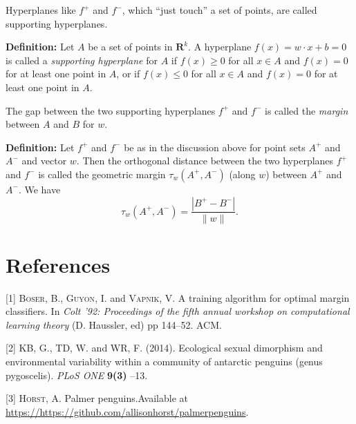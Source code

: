 \documentclass[
]{article}
\newenvironment{cslreferences}%
  {}%
  {\par}
\begin{document}
Hyperplanes like \(f^{+}\) and \(f^{-}\), which ``just touch'' a set of
points, are called supporting hyperplanes.

\textbf{Definition:} Let \(A\) be a set of points in \(\mathbf{R}^{k}\).
A hyperplane \(f(x)=w\cdot x+b=0\) is called a \emph{supporting
hyperplane} for \(A\) if \(f(x)\ge 0\) for all \(x\in A\) and \(f(x)=0\)
for at least one point in \(A\), or if \(f(x)\le 0\) for all \(x\in A\)
and \(f(x)=0\) for at least one point in \(A\).

The gap between the two supporting hyperplanes \(f^{+}\) and \(f^{-}\)
is called the \emph{margin} between \(A\) and \(B\) for \(w\).

\textbf{Definition:} Let \(f^{+}\) and \(f^{-}\) be as in the discussion
above for point sets \(A^{+}\) and \(A^{-}\) and vector \(w\). Then the
orthogonal distance between the two hyperplanes \(f^{+}\) and \(f^{-}\)
is called the geometric margin \(\tau_{w}(A^{+},A^{-})\) (along \(w\))
between \(A^{+}\) and \(A^{-}\). We have \[
\tau_{w}(A^{+},A^{-})=\frac{|B^{+}-B^{-}|}{\|w\|}.
\]

\hypertarget{bibliography}{%
\section*{References}\label{bibliography}}

\hypertarget{refs}{}
\begin{cslreferences}
\leavevmode\hypertarget{ref-vapnik92}{}%
{[}1{]} \textsc{Boser}, B., \textsc{Guyon}, I. and \textsc{Vapnik}, V. A
training algorithm for optimal margin classifiers. In \emph{Colt '92:
Proceedings of the fifth annual workshop on computational learning
theory} (D. Haussler, ed) pp 144--52. ACM.

\leavevmode\hypertarget{ref-penguins}{}%
{[}2{]} \textsc{KB}, G., \textsc{TD}, W. and \textsc{WR}, F. (2014).
Ecological sexual dimorphism and environmental variability within a
community of antarctic penguins (genus pygoscelis). \emph{PLoS ONE}
\textbf{9(3)} --13.

\leavevmode\hypertarget{ref-penguindata}{}%
{[}3{]} \textsc{Horst}, A. Palmer penguins.Available at
\url{https://https://github.com/allisonhorst/palmerpenguins}.
\end{cslreferences}
\end{document}
